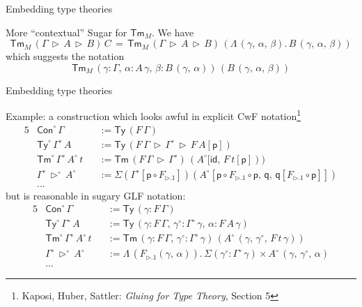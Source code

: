 \documentclass[dvipsnames,aspectratio=169]{beamer}
\newcommand{\ms}[1]{\mathsf{#1}}
\newcommand{\id}{\mathsf{id}}
\newcommand{\Con}{\mathsf{Con}}
\newcommand{\Sub}{\mathsf{Sub}}
\newcommand{\Tm}{\mathsf{Tm}}
\newcommand{\Ty}{\mathsf{Ty}}
\newcommand{\ext}{\triangleright}
\begin{document}
\begin{frame}{Embedding type theories}

More ``contextual'' Sugar for $\Tm_M$. We have
\[  \Tm_M\,(\Gamma\,\ext\,A\,\ext\,B)\,C \,=\, \Tm_M\,(\Gamma\,\ext\,A\,\ext\,B)\,(\Lambda\,(\gamma,\,\alpha,\,\beta).\,B\,(\gamma,\,\alpha,\,\beta)) \]
which suggests the notation
\[  \Tm_M\,(\gamma : \Gamma,\,\alpha : A\,\gamma,\,\beta : B\,(\gamma,\,\alpha))\,(B\,(\gamma,\,\alpha,\,\beta)) \]

\end{frame}

\begin{frame}{Embedding type theories}

Example: a construction which looks awful in explicit CwF notation\footnote{Kaposi, Huber, Sattler: \emph{Gluing for Type Theory}, Section 5}
{\small
\begin{alignat*}{5}
  &\Con^{\circ}\,\Gamma && := \Ty\,(F\,\Gamma)\\
  &\Ty^{\circ}\,\Gamma^{\circ}\,A && := \Ty\,(F\,\Gamma\,\ext\,\Gamma^{\circ}\,\ext\,F\,A[\ms{p}])\\
  &\Tm^{\circ}\,\Gamma^{\circ}\,A^{\circ}\,t && := \Tm\,(F\,\Gamma\,\ext\,\Gamma^{\circ})\,(A^{\circ}[\id,\,F\,t[\ms{p}]))\\
  & \Gamma^{\circ}\,\ext^{\circ}\,A^{\circ} && := \Sigma(\Gamma^{\circ}[\ms{p}\circ F_{\ext.1}])(A^{\circ}[\ms{p} \circ F_{\ext.1} \circ \ms{p},\,\ms{q},\,\ms{q}[F_{\ext.1} \circ \ms{p}]])\\
  & ... &&
\end{alignat*}
{\normalsize but is reasonable in sugary GLF notation:}
\begin{alignat*}{5}
  &\Con^{\circ}\,\Gamma && := \Ty\,(\gamma : F\,\Gamma)\\
  &\Ty^{\circ}\,\Gamma^{\circ}\,A && := \Ty\,(\gamma : F\,\Gamma,\,\gamma^{\circ} : \Gamma^{\circ}\,\gamma,\,\alpha : F\,A\,\gamma)\\
  &\Tm^{\circ}\,\Gamma^{\circ}\,A^{\circ}\,t && := \Tm\,(\gamma : F\,\Gamma,\,\gamma^{\circ} : \Gamma^{\circ}\,\gamma)\,(A^{\circ}\,(\gamma,\,\gamma^{\circ},\,F\,t\,\gamma))\\
  & \Gamma^{\circ}\,\ext^{\circ}\,A^{\circ} &&:= \Lambda\,(F_{\ext.1}(\gamma,\,\alpha)).\, \Sigma(\gamma^{\circ} : \Gamma^{\circ}\,\gamma) \times A^{\circ}\,(\gamma,\,\gamma^{\circ},\,\alpha)   \\
  & ... &&
\end{alignat*}
}

\end{frame}
\end{document}
